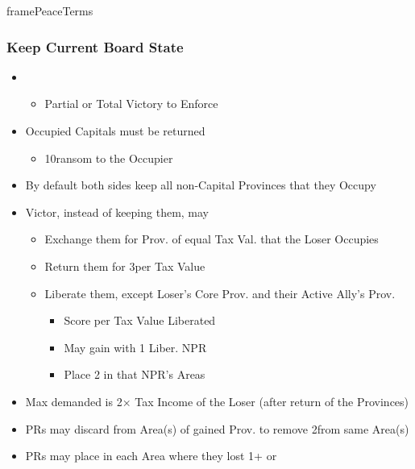 \documentclass[10pt]{article}
\begin{document}
\begin{dynamiccontents*}{framePeaceTerms}
\begin{multicols}{3}
		\subsubsection*{Keep Current Board State}
		\begin{itemize}
			\item {}
			\begin{itemize}
				\item Partial or Total Victory to Enforce
			\end{itemize}
			\item Occupied Capitals must be returned
			\begin{itemize}
				\item 10\ducats ransom to the Occupier
			\end{itemize}
			\item By default both sides keep all non-Capital Provinces that they Occupy
			\item Victor, instead of keeping them, may
			\begin{itemize}
				\item Exchange them for Prov. of equal Tax Val. that the Loser Occupies
				\item Return them for 3\ducats per Tax Value
				\item Liberate them, except Loser's Core Prov. and their Active Ally's Prov.
				\begin{itemize}
					\item Score  per Tax Value Liberated
					\item May gain \alliance with 1 Liber. NPR
					\item Place 2 \influence in that NPR's Areas
				\end{itemize}
			\end{itemize}
			\item Max \ducats demanded is 2× Tax Income of the Loser (after return of the Provinces)
			\item PRs may discard \claim from Area(s) of gained Prov. to remove 2\unrest from same Area(s)
			\item PRs may place \claim in each Area where they lost 1+ \town or \vassal
		\end{itemize}


\end{multicols}
\end{dynamiccontents*}
\end{document}
